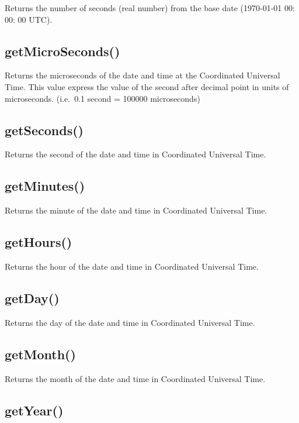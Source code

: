 \documentclass[]{book}
\theoremstyle{definition}
\theoremstyle{definition}
\theoremstyle{remark}
\begin{document}
Returns the number of seconds (real number) from the base date
(1970-01-01 00: 00: 00 UTC).

\subsection{getMicroSeconds()}\label{getmicroseconds}

Returns the microseconds of the date and time at the Coordinated
Universal Time. This value express the value of the second after decimal
point in units of microseconds. (i.e.~0.1 second = 100000 microseconds)

\subsection{getSeconds()}\label{getseconds}

Returns the second of the date and time in Coordinated Universal Time.

\subsection{getMinutes()}\label{getminutes}

Returns the minute of the date and time in Coordinated Universal Time.

\subsection{getHours()}\label{gethours}

Returns the hour of the date and time in Coordinated Universal Time.

\subsection{getDay()}\label{getday-1}

Returns the day of the date and time in Coordinated Universal Time.

\subsection{getMonth()}\label{getmonth-1}

Returns the month of the date and time in Coordinated Universal Time.

\subsection{getYear()}\label{getyear-1}
\end{document}
